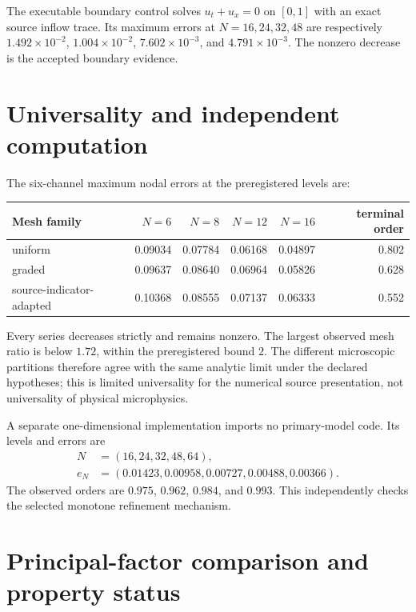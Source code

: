 \documentclass[11pt]{article}
\begin{document}
The executable boundary control solves $u_t+u_x=0$ on $[0,1]$ with an exact
source inflow trace.  Its maximum errors at $N=16,24,32,48$ are respectively
$1.492\times10^{-2}$, $1.004\times10^{-2}$,
$7.602\times10^{-3}$, and $4.791\times10^{-3}$.  The nonzero decrease is the
accepted boundary evidence.

\section{Universality and independent computation}

The six-channel maximum nodal errors at the preregistered levels are:
\begin{center}
\small
\begin{tabular}{lrrrrr}
\toprule
Mesh family & $N=6$ & $N=8$ & $N=12$ & $N=16$ & terminal order\\
\midrule
uniform & 0.09034 & 0.07784 & 0.06168 & 0.04897 & 0.802\\
graded & 0.09637 & 0.08640 & 0.06964 & 0.05826 & 0.628\\
source-indicator-adapted & 0.10368 & 0.08555 & 0.07137 & 0.06333 & 0.552\\
\bottomrule
\end{tabular}
\end{center}
Every series decreases strictly and remains nonzero.  The largest observed
mesh ratio is below $1.72$, within the preregistered bound $2$.  The different
microscopic partitions therefore agree with the same analytic limit under the
declared hypotheses; this is limited universality for the numerical source
presentation, not universality of physical microphysics.

A separate one-dimensional implementation imports no primary-model code.  Its
levels and errors are
\begin{equation*}
\begin{split}
  N&=(16,24,32,48,64),\\
  e_N&=(0.01423,0.00958,0.00727,0.00488,0.00366).
\end{split}
\end{equation*}
The observed orders are $0.975$, $0.962$, $0.984$, and $0.993$.  This
independently checks the selected monotone refinement mechanism.

\section{Principal-factor comparison and property status}
\end{document}
